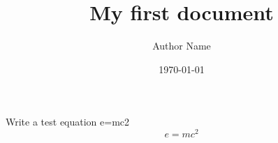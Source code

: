 
\title{My first document}
\author{Author Name}
\date{\today}
Write a test equation e=mc2
\begin{equation}
    e=mc^2

\end{equation}


\documentclass[options]{style}